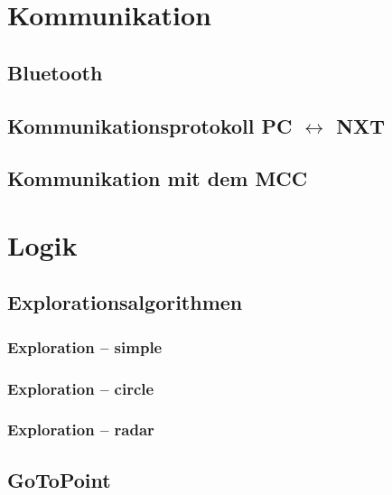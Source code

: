 \documentclass[10pt,a4paper]{scrartcl}
\begin{document}
\section{Kommunikation}
\subsection{Bluetooth}
\subsection{Kommunikationsprotokoll PC $\leftrightarrow$ NXT}
\subsection{Kommunikation mit dem MCC}
\section{Logik}
\subsection{Explorationsalgorithmen}
\subsubsection{Exploration -- simple}
\subsubsection{Exploration -- circle}
\subsubsection{Exploration -- radar}
\subsection{GoToPoint}
\end{document}
